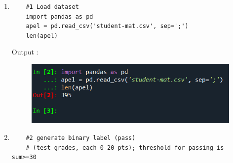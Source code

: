 \begin{enumerate}

\item
\begin{verbatim}
	#1 Load dataset
	import pandas as pd
	apel = pd.read_csv('student-mat.csv', sep=';')
	len(apel)
\end{verbatim}
	Output :
\begin{figure}[!htbp]
	\centering
	\includegraphics[scale=0.8]{figures/loaddataset1.PNG}
\end{figure}
\item
\begin{verbatim}
	#2 generate binary label (pass)
	# (test grades, each 0-20 pts); threshold for passing is sum>=30
	

\end{verbatim}
\end{enumerate}
